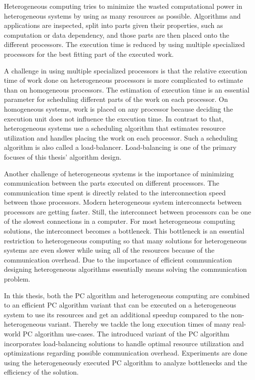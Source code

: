 Heterogeneous computing tries to minimize the wasted computational power in heterogeneous systems by using as many resources as possible. Algorithms and applications are inspected, split into parts given their properties, such as computation or data dependency, and those parts are then placed onto the different processors. The execution time is reduced by using multiple specialized processors for the best fitting part of the executed work.

A challenge in using multiple specialized processors is that the relative execution time of work done on heterogeneous processors is more complicated to estimate than on homogeneous processors. The estimation of execution time is an essential parameter for scheduling different parts of the work on each processor. On homogeneous systems, work is placed on any processor because deciding the execution unit does not influence the execution time. In contrast to that, heterogeneous systems use a scheduling algorithm that estimates resource utilization and handles placing the work on each processor. Such a scheduling algorithm is also called a load-balancer. Load-balancing is one of the primary focuses of this thesis' algorithm design.

Another challenge of heterogeneous systems is the importance of minimizing communication between the parts executed on different processors. The communication time spent is directly related to the interconnection speed between those processors. Modern heterogeneous system interconnects between processors are getting faster. Still, the interconnect between processors can be one of the slowest connections in a computer. For most heterogeneous computing solutions, the interconnect becomes a bottleneck. This bottleneck is an essential restriction to heterogeneous computing so that many solutions for heterogeneous systems are even slower while using all of the resources because of the communication overhead. Due to the importance of efficient communication designing heterogeneous algorithms essentially means solving the communication problem.

In this thesis, both the PC algorithm and heterogeneous computing are combined to an efficient PC algorithm variant that can be executed on a heterogeneous system to use its resources and get an additional speedup compared to the non-heterogeneous variant. Thereby we tackle the long execution times of many real-world PC algorithm use-cases. The introduced variant of the PC algorithm incorporates load-balancing solutions to handle optimal resource utilization and optimizations regarding possible communication overhead. Experiments are done using the heterogeneously executed PC algorithm to analyze bottlenecks and the efficiency of the solution.


